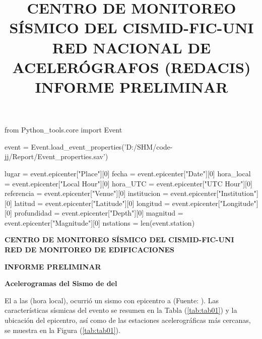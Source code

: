 \documentclass[11pt, a4paper]{report}
\title{CENTRO DE MONITOREO SÍSMICO DEL CISMID-FIC-UNI \\
RED NACIONAL DE ACELERÓGRAFOS (REDACIS)\\
INFORME PRELIMINAR\\
}
\begin{document}
\begin{pycode}
from Python_tools.core import Event

event = Event.load_event_properties('D:/SHM/code-jj/Report/Event_properties.sav')

lugar = event.epicenter["Place"][0]
fecha = event.epicenter["Date"][0]
hora_local = event.epicenter["Local Hour"][0]
hora_UTC = event.epicenter["UTC Hour"][0]
referencia = event.epicenter["Venue"][0]
institucion = event.epicenter["Institution"][0]
latitud = event.epicenter["Latitude"][0]
longitud = event.epicenter["Longitude"][0]
profundidad = event.epicenter["Depth"][0]
magnitud = event.epicenter["Magnitude"][0]
nstations = len(event.station)

\end{pycode}

\begin{center}
\centering 
\textbf{CENTRO DE MONITOREO SÍSMICO DEL CISMID-FIC-UNI \\
RED DE MONITOREO DE EDIFICACIONES}
\vspace{0.3cm}

\textbf{INFORME PRELIMINAR}
\vspace{0.3cm}

\textbf{Acelerogramas del Sismo de  del }
\vspace{0.25cm}
\end{center}

El  a las  (hora local), ocurrió un sismo con epicentro a  (Fuente: ). Las características sísmicas del evento 
se resumen en la Tabla (\ref{tab:tab01}) y la ubicación del epicentro, así como de las estaciones 
acelerográficas más cercanas, se muestra en la Figura (\ref{tab:tab01}). \\
\end{document}
